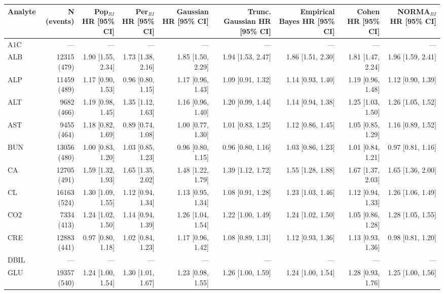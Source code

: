 \begin{table}[ht]
\centering
\footnotesize
\begin{tabular}{lrrrrrrrr}
\toprule
Analyte & N (events) & Pop$_{RI}$ HR [95\% CI] & Per$_{RI}$ HR [95\% CI] & Gaussian HR [95\% CI] & Trunc. Gaussian HR [95\% CI] & Empirical Bayes HR [95\% CI] & Cohen HR [95\% CI] & NORMA$_{RI}$ HR [95\% CI] \\
\midrule
A1C & --- & --- & --- & --- & --- & --- & --- & --- \\
ALB & 12315 (479) & 1.90 [1.55, 2.34] & 1.73 [1.38, 2.16] & 1.85 [1.50, 2.29] & 1.94 [1.53, 2.47] & 1.86 [1.51, 2.30] & 1.81 [1.47, 2.24] & 1.96 [1.59, 2.41] \\
ALP & 11459 (489) & 1.17 [0.90, 1.53] & 0.96 [0.80, 1.15] & 1.17 [0.96, 1.43] & 1.09 [0.91, 1.32] & 1.14 [0.93, 1.40] & 1.19 [0.96, 1.48] & 1.12 [0.90, 1.39] \\
ALT & 9682 (466) & 1.19 [0.98, 1.45] & 1.35 [1.12, 1.63] & 1.16 [0.96, 1.40] & 1.20 [0.99, 1.44] & 1.14 [0.94, 1.38] & 1.25 [1.03, 1.50] & 1.26 [1.05, 1.52] \\
AST & 9455 (464) & 1.18 [0.82, 1.69] & 0.89 [0.74, 1.08] & 1.00 [0.77, 1.30] & 1.01 [0.83, 1.25] & 1.12 [0.86, 1.45] & 1.05 [0.85, 1.29] & 1.16 [0.89, 1.52] \\
BUN & 13056 (480) & 1.00 [0.83, 1.20] & 1.03 [0.85, 1.23] & 0.96 [0.80, 1.15] & 0.96 [0.80, 1.16] & 1.03 [0.86, 1.23] & 1.01 [0.84, 1.21] & 0.97 [0.81, 1.16] \\
CA & 12705 (491) & 1.59 [1.32, 1.93] & 1.65 [1.35, 2.02] & 1.48 [1.22, 1.79] & 1.39 [1.12, 1.72] & 1.55 [1.28, 1.88] & 1.67 [1.37, 2.03] & 1.65 [1.36, 2.00] \\
CL & 16163 (524) & 1.30 [1.09, 1.55] & 1.12 [0.94, 1.34] & 1.13 [0.95, 1.34] & 1.08 [0.91, 1.28] & 1.23 [1.03, 1.46] & 1.12 [0.94, 1.33] & 1.26 [1.06, 1.49] \\
CO2 & 7334 (413) & 1.24 [1.02, 1.50] & 1.14 [0.94, 1.39] & 1.26 [1.04, 1.54] & 1.22 [1.00, 1.49] & 1.24 [1.02, 1.50] & 1.05 [0.86, 1.28] & 1.28 [1.05, 1.55] \\
CRE & 12883 (441) & 0.97 [0.80, 1.18] & 1.02 [0.84, 1.23] & 1.17 [0.96, 1.42] & 1.08 [0.89, 1.31] & 1.12 [0.93, 1.36] & 1.13 [0.93, 1.36] & 0.98 [0.81, 1.20] \\
DBIL & --- & --- & --- & --- & --- & --- & --- & --- \\
GLU & 19357 (540) & 1.24 [1.00, 1.54] & 1.30 [1.01, 1.67] & 1.23 [0.98, 1.55] & 1.26 [1.00, 1.59] & 1.24 [1.00, 1.54] & 1.28 [0.93, 1.76] & 1.25 [1.00, 1.56] \\

\end{tabular}
\end{table}
